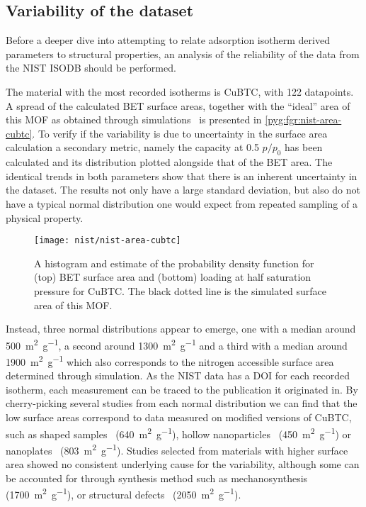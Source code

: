 \subsection{Variability of the dataset}

Before a deeper dive into attempting to relate adsorption isotherm
derived parameters to structural properties, an analysis of the 
reliability of the data from the NIST ISODB should be performed.

The material with the most recorded isotherms is CuBTC, with 
122 datapoints. A spread of the calculated BET surface areas,
together with the ``ideal'' area of this MOF as obtained
through simulations~\cite{parkHowReproducibleAre2017} is 
presented in \autoref{pyg:fgr:nist-area-cubtc}.
To verify if the variability is due to uncertainty in the 
surface area calculation a secondary metric, namely the 
capacity at 0.5 \(p/p_0\) has been calculated and its 
distribution plotted alongside that of the BET area. The
identical trends in both parameters show that there is an
inherent uncertainty in the dataset. The results not only 
have a large standard deviation, but also do not have a 
typical normal distribution one would expect from repeated
sampling of a physical property.

\begin{wrapfigure}{h}{0.5\textwidth}
    \centering
    \captionsetup{format=plain}
    \texttt{[image: nist/nist-area-cubtc]}%
    \caption{A histogram and estimate of the probability density 
    function for (top) BET surface area and (bottom) loading
    at half saturation pressure for CuBTC. The black dotted line
    is the simulated surface area of this MOF.}%
    \label{pyg:fgr:nist-area-cubtc}
\end{wrapfigure}

Instead, three normal distributions appear to emerge, one with a
median around \SI{500}{\metre^2\per\gram}, a second around \SI{1300}{\metre^2\per\gram}
and a third with a median around \SI{1900}{\metre^2\per\gram} which also
corresponds to the nitrogen accessible surface area determined through
simulation. As the NIST data has a DOI for each recorded isotherm, each
measurement can be traced to the publication it originated in.
By cherry-picking several studies from each normal distribution
we can find that the low surface areas correspond to data 
measured on modified versions of CuBTC, such as shaped 
samples~\cite{liSeparationCO2CH42014} (\SI{640}{\metre^2\per\gram}), hollow 
nanoparticles~\cite{liControllableSynthesisMetal2013} (\SI{450}{\metre^2\per\gram})
or nanoplates~\cite{pengSurfactantdirectedAssemblyMesoporous2012}
(\SI{803}{\metre^2\per\gram}).
Studies selected from materials with higher surface area 
showed no consistent underlying cause for the variability,
although some can be accounted for through synthesis method
such as mechanosynthesis~\cite{klimakowMechanochemicalSynthesisMetal2010}
(\SI{1700}{\metre^2\per\gram}), or structural 
defects~\cite{barinDefectCreationLinker2014} (\SI{2050}{\metre^2\per\gram}).

